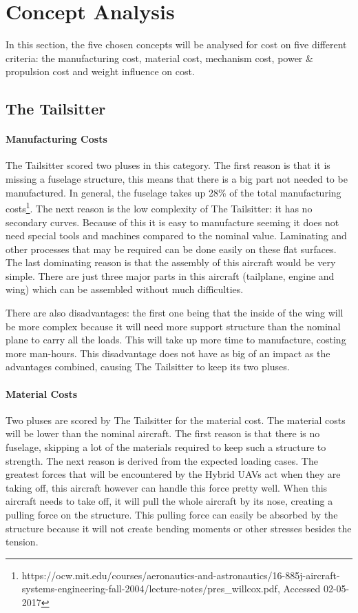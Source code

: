 \section{Concept Analysis}
\label{sec:conanal}
In this section, the five chosen concepts will be analysed for cost on five different criteria: the manufacturing cost, material cost, mechanism cost, power \& propulsion cost and weight influence on cost.  
\subsection{The Tailsitter}

\paragraph{Manufacturing Costs}\label{sec:tailmanu}

The Tailsitter scored two pluses in this category. The first reason is that it is missing a fuselage structure, this means that there is a big part not needed to be manufactured. In general, the fuselage takes up 28\% of the total manufacturing costs\footnote{https://ocw.mit.edu/courses/aeronautics-and-astronautics/16-885j-aircraft-systems-engineering-fall-2004/lecture-notes/pres\_willcox.pdf, Accessed 02-05-2017}. The next reason is the low complexity of The Tailsitter: it has no secondary curves. Because of this it is easy to manufacture seeming it does not need special tools and machines compared to the nominal value. Laminating and other processes that may be required can be done easily on these flat surfaces. The last dominating reason is that the assembly of this aircraft would be very simple. There are just three major parts in this aircraft (tailplane, engine and wing) which can be assembled without much difficulties.

There are also disadvantages: the first one being that the inside of the wing will be more complex because it will need more support structure than the nominal plane to carry all the loads. This will take up more time to manufacture, costing more man-hours. This disadvantage does not have as big of an impact as the advantages combined, causing The Tailsitter to keep its two pluses.


\paragraph{Material Costs}

Two pluses are scored by The Tailsitter for the material cost. The material costs will be lower than the nominal aircraft. The first reason is that there is no fuselage, skipping a lot of the materials required to keep such a structure to strength. The next reason is derived from the expected loading cases. The greatest forces that will be encountered by the Hybrid UAVs act when they are taking off, this aircraft however can handle this force pretty well. When this aircraft needs to take off, it will pull the whole aircraft by its nose, creating a pulling force on the structure. This pulling force can easily be absorbed by the structure because it will not create bending moments or other stresses besides the tension.


